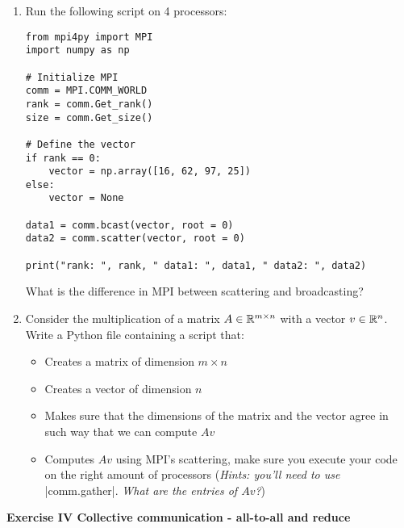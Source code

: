 \documentclass[11pt]{article}
\begin{document}
\begin{enumerate}
    \item Run the following script on 4 processors:  
    \begin{verbatim}
from mpi4py import MPI
import numpy as np

# Initialize MPI
comm = MPI.COMM_WORLD
rank = comm.Get_rank()
size = comm.Get_size()

# Define the vector
if rank == 0:
    vector = np.array([16, 62, 97, 25])
else:
    vector = None

data1 = comm.bcast(vector, root = 0)
data2 = comm.scatter(vector, root = 0)

print("rank: ", rank, " data1: ", data1, " data2: ", data2) 
    \end{verbatim}
    What is the difference in MPI between scattering and broadcasting? %
    \item Consider the multiplication of a matrix $A \in \mathbb{R}^{m \times n}$ with a vector $v \in \mathbb{R}^n$. Write a Python file containing a script that:
    \begin{itemize}
        \item Creates a matrix of dimension $m \times n$
        \item Creates a vector of dimension $n$
        \item Makes sure that the dimensions of the matrix and the vector agree in such way that we can compute $Av$
        \item Computes $Av$ using MPI's scattering, make sure you execute your code on the right amount of processors (\textit{Hints: you'll need to use} |comm.gather|. \textit{What are the entries of $Av$?})
    \end{itemize}
\end{enumerate}

{\bf{Exercise IV Collective communication - all-to-all and reduce }}\\
\end{document}
